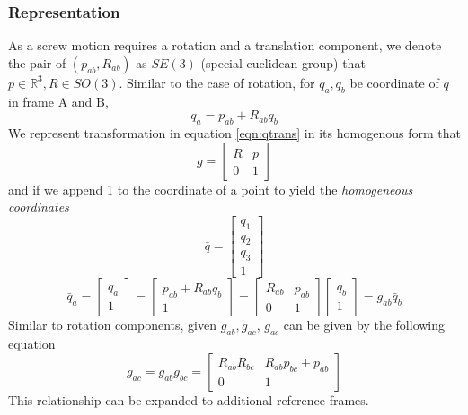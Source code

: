 \documentclass[letterpaper]{article}
\begin{document}
\subsubsection{Representation}
As a screw motion requires a rotation and a translation component, we denote the pair of 
$(p_{ab}, R_{ab})$ as $SE(3)$ (special euclidean group) that $p\in \mathbb{R}^3, R\in SO(3)$.
Similar to the case of rotation, for $q_a, q_b$ be coordinate of $q$ in frame 
A and B, 
\begin{equation} \label{eqn:qtrans}
  {q}_a = p_{ab} + R_{ab}q_b
\end{equation}
We represent transformation in equation \ref{eqn:qtrans} in its homogenous form that
\begin{equation}
  g = \begin{bmatrix}
    R & p \\ 0 & 1
  \end{bmatrix}
\end{equation}
and if we append 1 to the coordinate of a point to yield the \emph{homogeneous coordinates}
\begin{equation}
  \bar{q} = \begin{bmatrix}
    q_1\\q_2\\q_3\\1
  \end{bmatrix}
\end{equation}
\begin{equation}
  \bar{q}_a = \begin{bmatrix} q_a\\1 \end{bmatrix}
   = \begin{bmatrix}
    p_{ab} + R_{ab}q_b\\
    1
   \end{bmatrix}
   = \begin{bmatrix} R_{ab} & p_{ab}\\0&1 \end{bmatrix}
  \begin{bmatrix}
    q_b \\ 1
  \end{bmatrix} = g_{ab}\bar{q}_b
\end{equation}
Similar to rotation components, given $g_{ab}, g_{ac}$, $g_{ac}$ can be given by the following equation
\begin{equation}
  g_{ac} = g_{ab} g_{bc} = \begin{bmatrix}
    R_{ab}R_{bc} & R_{ab}p_{bc} + p_{ab}\\0 & 1
  \end{bmatrix}
\end{equation}
This relationship can be expanded to additional reference frames. 
\end{document}
